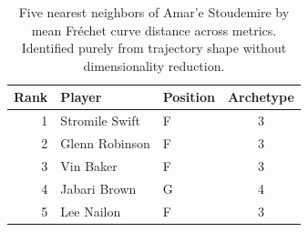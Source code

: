 \begin{table}[htbp]
  \centering\small
  \begin{tabular}{rllc}
    \toprule
    Rank & Player & Position & Archetype \\
    \midrule
    1 & Stromile Swift & F & 3 \\
    2 & Glenn Robinson & F & 3 \\
    3 & Vin Baker & F & 3 \\
    4 & Jabari Brown & G & 4 \\
    5 & Lee Nailon & F & 3 \\
    \bottomrule
  \end{tabular}
  \caption{Five nearest neighbors of Amar'e Stoudemire by mean Fr\'{e}chet curve distance across metrics. Identified purely from trajectory shape without dimensionality reduction.}
  \label{tab:Amar_e_Stoudemire_frechet_curve_neighbors}
\end{table}


